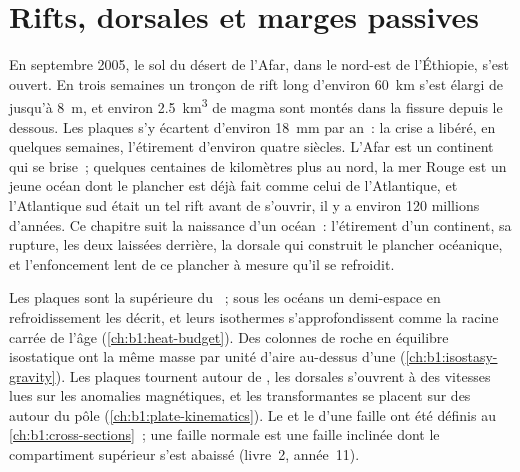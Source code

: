\chapter{Rifts, dorsales et marges passives}\label{ch:b1:rifts-ridges-margins}

En septembre 2005, le sol du désert de l'Afar, dans le nord-est de l'Éthiopie,
s'est ouvert. En trois semaines un tronçon de rift long d'environ \qty{60}{km} s'est élargi de
jusqu'à \qty{8}{m}, et environ \qty{2.5}{km^3} de magma sont montés dans la fissure depuis
le dessous. Les plaques s'y écartent d'environ \qty{18}{mm} par an~: la crise
a libéré, en quelques semaines, l'étirement d'environ quatre siècles. L'Afar est un
continent qui se brise~; quelques centaines de kilomètres plus au nord, la mer Rouge
est un jeune océan dont le plancher est déjà fait comme celui de l'Atlantique,
et l'Atlantique sud était un tel rift avant de s'ouvrir, il y a environ 120 millions
d'années. Ce chapitre suit la naissance d'un océan~: l'étirement d'un
continent, sa rupture, les deux  laissées derrière,
la dorsale qui construit le plancher océanique, et l'enfoncement lent de ce plancher à mesure qu'il se refroidit.

\begin{recall}
Les plaques sont la  supérieure du ~; sous les
océans un demi-espace en refroidissement les décrit, et leurs isothermes s'approfondissent comme la
racine carrée de l'âge (\cref{ch:b1:heat-budget}). Des colonnes de roche en équilibre
isostatique ont la même masse par unité d'aire au-dessus d'une 
(\cref{ch:b1:isostasy-gravity}). Les plaques tournent autour de , les dorsales s'ouvrent
à des vitesses lues sur les anomalies magnétiques, et les transformantes se placent sur des 
autour du pôle (\cref{ch:b1:plate-kinematics}). Le  et le  d'une
faille ont été définis au \cref{ch:b1:cross-sections}~; une faille normale est une faille
inclinée dont le compartiment supérieur s'est abaissé (livre~2, année~11).
\end{recall}

